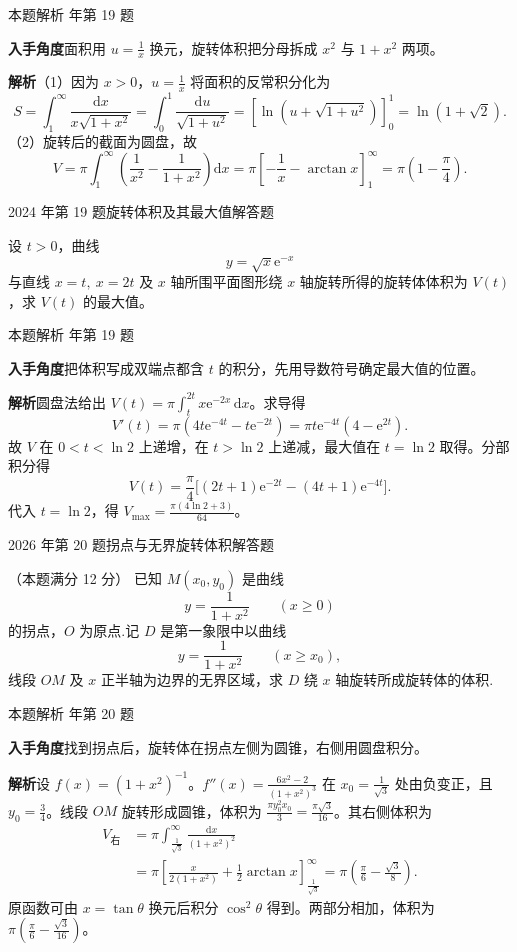 \documentclass[UTF8,zihao=-4,fontset=fandol]{ctexart}
\newcommand{\QuestionPage}[6]{%
  \par\noindent\begin{minipage}{\linewidth}
  \raggedright
  {\small\textcolor{black!60}{#3\quad #5}\hfill\textcolor{accent}{#2}}\par\smallskip}
\newcommand{\QuestionEnd}{\end{minipage}\par\medskip}
\newcommand{\QuestionPage}[6]{%
  \clearpage
  {\small\textcolor{accent}{#1\hfill #2}}\par\medskip
  {\small\textcolor{black!60}{#3\quad #5\hfill #6}}\par\vspace{9bp}}
\newcommand{\QuestionEnd}{}
\newenvironment{QuestionSolution}[1]{%
  \clearpage
  {\small\textcolor{black!60}{本题解析\quad #1}}\par\medskip
}{\par\clearpage}
\begin{document}
\begin{QuestionSolution}{2023 年第 19 题}
\textbf{入手角度}\quad 面积用 \(u=\frac{1}{x}\) 换元，旋转体积把分母拆成 \(x^2\) 与 \(1+x^2\) 两项。

\textbf{解析}\quad （1）因为 \(x>0\)，\(u=\frac{1}{x}\) 将面积的反常积分化为
\[
S=\int_1^\infty\frac{\mathrm{d}x}{x\sqrt{1+x^2}}
=\int_0^1\frac{\mathrm{d}u}{\sqrt{1+u^2}}
=\left[\ln(u+\sqrt{1+u^2})\right]_0^1
=\boxed{\ln(1+\sqrt2)}.
\]
（2）旋转后的截面为圆盘，故
\[
V=\pi\int_1^\infty\left(\frac1{x^2}-\frac1{1+x^2}\right)\mathrm{d}x
=\pi\left[-\frac1x-\arctan x\right]_1^\infty
=\boxed{\pi\left(1-\frac\pi4\right)} .
\]
\end{QuestionSolution}

\QuestionPage{3.4 定积分的应用}{解答题}{2024 年第 19 题}{3}{旋转体积及其最大值}{187 / 234}
设 \(t>0\)，曲线
\[y=\sqrt{x}\mathrm{e}^{-x}
\]
与直线 \(x=t,\ x=2t\) 及 \(x\) 轴所围平面图形绕 \(x\) 轴旋转所得的旋转体体积为 \(V(t)\)，求 \(V(t)\) 的最大值。
\QuestionEnd

\begin{QuestionSolution}{2024 年第 19 题}
\textbf{入手角度}\quad 把体积写成双端点都含 \(t\) 的积分，先用导数符号确定最大值的位置。

\textbf{解析}\quad 圆盘法给出 \(V(t)=\pi\int_t^{2t}x\mathrm{e}^{-2x}\,\mathrm{d}x\)。求导得
\[
V'(t)=\pi(4t\mathrm{e}^{-4t}-t\mathrm{e}^{-2t})
=\pi t\mathrm{e}^{-4t}(4-\mathrm{e}^{2t}).
\]
故 \(V\) 在 \(0<t<\ln2\) 上递增，在 \(t>\ln2\) 上递减，最大值在 \(t=\ln2\) 取得。分部积分得
\[
V(t)=\frac{\pi}{4}\bigl[(2t+1)\mathrm{e}^{-2t}-(4t+1)\mathrm{e}^{-4t}\bigr].
\]
代入 \(t=\ln2\)，得 \(V_{\max}=\boxed{\frac{\pi(4\ln2+3)}{64}}\)。
\end{QuestionSolution}

\QuestionPage{3.4 定积分的应用}{解答题}{2026 年第 20 题}{2}{拐点与无界旋转体积}{188 / 234}
（本题满分 12 分）
已知 \(M(x_0,y_0)\) 是曲线
\[y=\frac{1}{1+x^2}\qquad (x\ge 0)
\]
的拐点，\(O\) 为原点.记 \(D\) 是第一象限中以曲线
\[y=\frac{1}{1+x^2}\qquad (x\ge x_0),
\]
线段 \(OM\) 及 \(x\) 正半轴为边界的无界区域，求 \(D\) 绕 \(x\) 轴旋转所成旋转体的体积.
\QuestionEnd

\begin{QuestionSolution}{2026 年第 20 题}
\textbf{入手角度}\quad 找到拐点后，旋转体在拐点左侧为圆锥，右侧用圆盘积分。

\textbf{解析}\quad 设 \(f(x)=(1+x^2)^{-1}\)。\(f''(x)=\frac{6x^2-2}{(1+x^2)^3}\) 在 \(x_0=\frac{1}{\sqrt3}\) 处由负变正，且 \(y_0=\frac{3}{4}\)。线段 \(OM\) 旋转形成圆锥，体积为 \(\frac{\pi y_0^2 x_0}{3}=\frac{\pi\sqrt3}{16}\)。其右侧体积为
\[
\begin{aligned}
V_{\text{右}}
&=\pi\int_{\frac{1}{\sqrt3}}^\infty\frac{\mathrm{d}x}{(1+x^2)^2}\\
&=\pi\left[\frac{x}{2(1+x^2)}+\frac12\arctan x\right]_{\frac{1}{\sqrt3}}^\infty
=\pi\left(\frac\pi6-\frac{\sqrt3}{8}\right).
\end{aligned}
\]
原函数可由 \(x=\tan\theta\) 换元后积分 \(\cos^2\theta\) 得到。两部分相加，体积为 \(\boxed{\pi(\frac{\pi}{6}-\frac{\sqrt3}{16})}\)。
\end{QuestionSolution}
\end{document}
